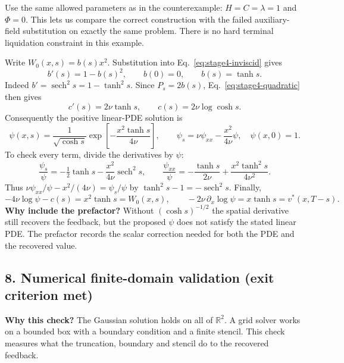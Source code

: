 \documentclass[11pt,a4paper]{article}
\begin{document}
Use the same allowed parameters as in the counterexample:
$H=C=\lambda=1$ and $\Phi=0$. This lets us compare the correct construction
with the failed auxiliary-field substitution on exactly the same problem.
There is no hard terminal liquidation constraint in this example.

Write $W_0(x,s)=b(s)x^2$. Substitution into
Eq.~\eqref{eq:stage4-inviscid} gives
\[
 b'(s)=1-b(s)^2,\qquad b(0)=0,\qquad b(s)=\tanh s.
\]
Indeed $b'=\operatorname{sech}^2s=1-\tanh^2s$. Since $P_s=2b(s)$,
Eq.~\eqref{eq:stage4-quadratic} then gives
\[
 c'(s)=2\nu\tanh s,\qquad
 c(s)=2\nu\log\cosh s.
\]
Consequently the positive linear-PDE solution is
\begin{equation}
 \boxed{\psi(x,s)=\frac{1}{\sqrt{\cosh s}}
 \exp\left[-\frac{x^2\tanh s}{4\nu}\right],\qquad
 \psi_s=\nu\psi_{xx}-\frac{x^2}{4\nu}\psi,\quad\psi(x,0)=1.}
 \label{eq:stage4-scalar-solution}
\end{equation}
To check every term, divide the derivatives by $\psi$:
\[
 \frac{\psi_s}{\psi}=-\tfrac12\tanh s
 -\frac{x^2}{4\nu}\operatorname{sech}^2s,\qquad
 \frac{\psi_{xx}}{\psi}=-\frac{\tanh s}{2\nu}
 +\frac{x^2\tanh^2s}{4\nu^2}.
\]
Thus $\nu\psi_{xx}/\psi-x^2/(4\nu)=\psi_s/\psi$ by
$\tanh^2s-1=-\operatorname{sech}^2s$. Finally,
\[
 -4\nu\log\psi-c(s)=x^2\tanh s=W_0(x,s),\qquad
 -2\nu\,\partial_x\log\psi=x\tanh s=v^*(x,T-s).
\]
\textbf{Why include the prefactor?} Without $(\cosh s)^{-1/2}$ the
spatial derivative still recovers the feedback, but the proposed $\psi$
does not satisfy the stated linear PDE. The prefactor records the scalar
correction needed for both the PDE and the recovered value.

\subsection*{8. Numerical finite-domain validation (exit criterion met)}

\textbf{Why this check?} The Gaussian solution holds on all of
$\mathbb R^2$. A grid solver works on a bounded box with a boundary
condition and a finite stencil. This check measures what the
truncation, boundary and stencil do to the recovered feedback.
\end{document}

